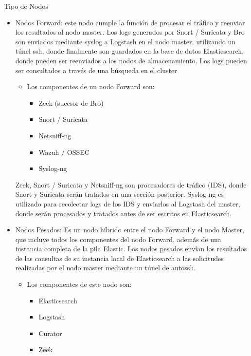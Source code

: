 \begin{subsubsection}{Tipo de Nodos}
\begin{itemize}
          \item Nodos Forward: este nodo cumple la función de procesar el tráfico y reenviar los resultados al nodo master. Los logs generados por Snort / Suricata y Bro son enviados mediante syslog a Logstash en el nodo master, utilizando un túnel ssh, donde finalmente son guardados en la base de datos Elasticsearch, donde pueden ser reenviados a los nodos de almacenamiento. Los logs pueden ser consultados a través de una búsqueda en el cluster
            \begin{itemize}
               \item Los componentes de un nodo Forward son:
               \begin{itemize}
                   \item Zeek \cite{zeek} (sucesor de Bro)
                   \item Snort \cite{snort} / Suricata \cite{suricata}
                   \item Netsniff-ng \cite{netsniff-ng}
                   \item Wazuh \cite{wazuh} / OSSEC \cite{ossec}
                   \item Syslog-ng \cite{syslog-ng}
               \end{itemize}
            \end{itemize}
            Zeek, Snort / Suricata y Netsniff-ng son procesadores de tráfico (IDS), donde Snort y Suricata serán tratados en una sección posterior. Syslog-ng es utilizado para recolectar logs de los IDS y enviarlos al Logstash del master, donde serán procesados y tratados antes de ser escritos en Elasticsearch.
            \item Nodos Pesados: Es un nodo híbrido entre el nodo Forward y el nodo Master, que incluye todos los componentes del nodo Forward, además de una instancia completa de la pila Elastic. Los nodos pesados envían los resultados de las consultas de su instancia local de Elasticsearch a las solicitudes realizadas por el nodo master mediante un túnel de autossh.
            \begin{itemize}
                \item Los componentes de este nodo son:
                \begin{itemize}
                    \item Elasticsearch
                    \item Logstash
                    \item Curator
                    \item Zeek

\end{itemize}
\end{itemize}
\end{itemize}
\end{subsubsection}
